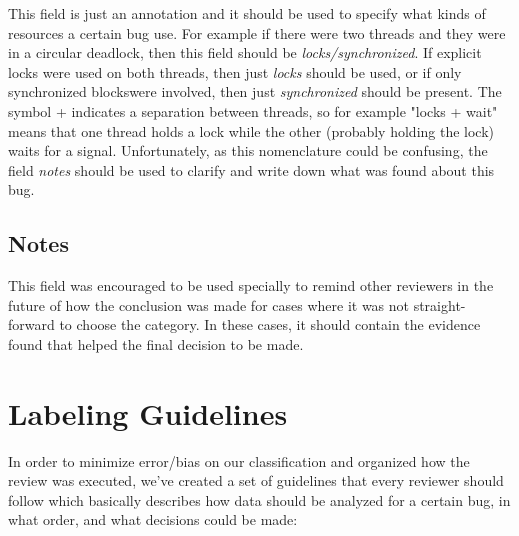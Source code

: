 This field is just an annotation and it should be used to specify what kinds of resources a certain bug use. For example if there were two threads and they were in a circular deadlock, then this field should be \emph{locks/synchronized}. If explicit locks were used on both threads, then just \emph{locks} should be used, or if only synchronized blockswere involved, then just \emph{synchronized} should be present. The symbol + indicates a separation between threads, so for example "locks + wait" means that one thread holds a lock while the other (probably holding the lock) waits for a signal. Unfortunately, as this nomenclature could be confusing, the field \emph{notes} should be used to clarify and write down what was found about this bug.

\subsection{Notes}

This field was encouraged to be used specially to remind other reviewers in the future of how the conclusion was made for cases where it was not straight-forward to choose the category. In these cases, it should contain the evidence found that helped the final decision to be made.

\section{Labeling Guidelines} 

In order to minimize error/bias on our classification and organized how the review was executed, we've created a set of guidelines that every reviewer should follow which basically describes how data should be analyzed for a certain bug, in what order, and what decisions could be made:

